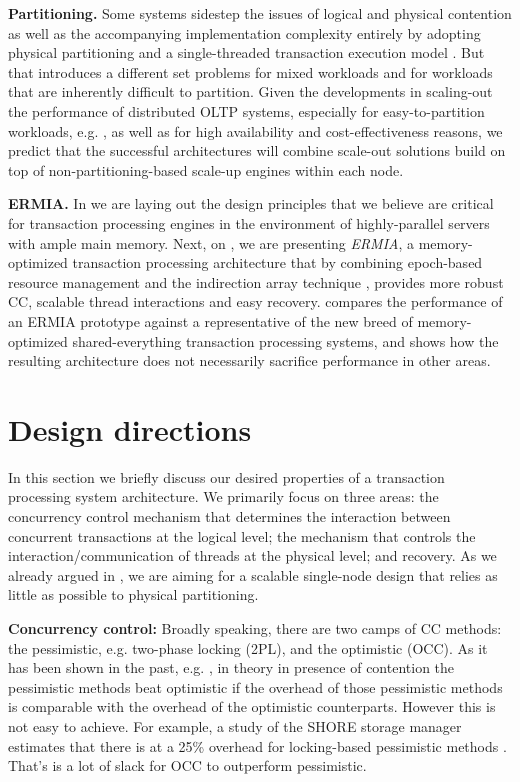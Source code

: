 \vspace{2mm}
{\bf Partitioning.} Some systems sidestep the issues of logical and physical contention as well as the accompanying implementation complexity entirely by adopting physical partitioning and a single-threaded transaction execution model \cite{Kallman+08,KemperN11}. But that introduces a different set problems for mixed workloads and for workloads that are inherently difficult to partition.  Given the developments in scaling-out the performance of distributed OLTP systems, especially for easy-to-partition workloads, e.g. \cite{Corbett+12,BailisFHGS14,ThomsonA10}, as well as for high availability and cost-effectiveness reasons, we predict that the successful architectures will combine scale-out solutions build on top of non-partitioning-based scale-up engines within each node.

\vspace{2mm}
{\bf ERMIA.} 
In  we are laying out the design principles that we believe are critical for transaction processing engines in the environment of highly-parallel servers with ample main memory. Next, on , we are presenting {\em ERMIA}, a memory-optimized transaction processing architecture that by combining epoch-based resource management and the indirection array technique \cite{SadoghiRCB13}, provides more robust CC, scalable thread interactions and easy recovery.  
 compares the performance of an ERMIA prototype against a representative of the new breed of memory-optimized shared-everything transaction processing systems, and shows how the resulting architecture does not necessarily sacrifice performance in other areas.


\section{Design directions}

In this section we briefly discuss our desired properties of a transaction processing system architecture. We primarily focus on three areas: the concurrency control mechanism that determines the interaction between concurrent transactions at the logical level; the mechanism that controls the interaction/communication of threads at the physical level; and recovery. As we already argued in , we are aiming for a scalable single-node design that relies as little as possible to physical partitioning.  

\vspace{2mm} 
{\bf Concurrency control:} 
Broadly speaking, there are two camps of CC methods: the pessimistic, e.g. two-phase locking (2PL), and the optimistic (OCC). As it has been shown in the past, e.g. \cite{AgrawalCL87}, in theory in presence of contention the  pessimistic methods beat optimistic if the overhead of those pessimistic methods is comparable with the overhead of the optimistic counterparts. However this is not easy to achieve. For example, a study of the SHORE storage manager estimates that there is at a 25\% overhead for locking-based pessimistic methods \cite{HarizopoulosAMS08}. That's is a lot of slack for OCC to outperform pessimistic.

